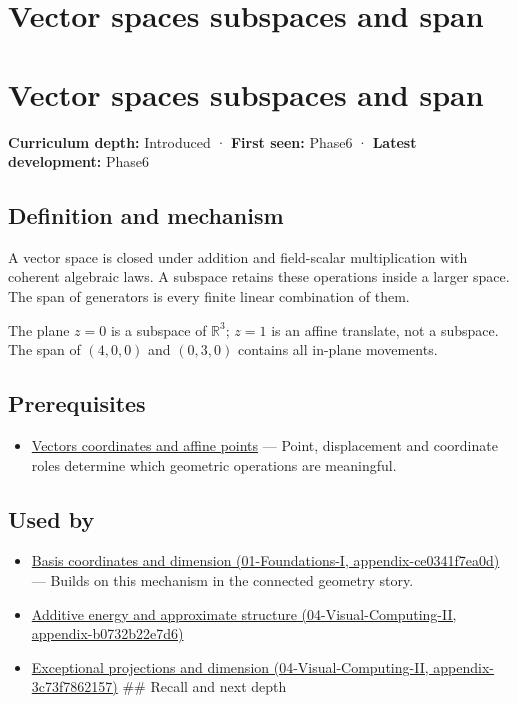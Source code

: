 \hypertarget{appendix-173b52c063ae}{}
\section*{Vector spaces subspaces and span}
\section{Vector spaces subspaces and span}\label{vector-spaces-subspaces-and-span}

\textbf{Curriculum depth:} Introduced · \textbf{First seen:} Phase6 · \textbf{Latest development:} Phase6

\subsection{Definition and mechanism}\label{definition-and-mechanism}

A vector space is closed under addition and field-scalar multiplication with coherent algebraic laws. A subspace retains these operations inside a larger space. The span of generators is every finite linear combination of them.

The plane \(z=0\) is a subspace of \(\mathbb R^3\); \(z=1\) is an affine translate, not a subspace. The span of \((4,0,0)\) and \((0,3,0)\) contains all in-plane movements.

\subsection{Prerequisites}\label{prerequisites}

\begin{itemize}
\tightlist
\item
  \hyperref[appendix-0659864c0aa3]{Vectors coordinates and affine points} --- Point, displacement and coordinate roles determine which geometric operations are meaningful.
\end{itemize}

\subsection{Used by}\label{used-by}

\begin{itemize}
\item
  \href{}{Basis coordinates and dimension (01-Foundations-I, appendix-ce0341f7ea0d)} --- Builds on this mechanism in the connected geometry story.
\item
  \href{}{Additive energy and approximate structure (04-Visual-Computing-II, appendix-b0732b22e7d6)}
\item
  \href{}{Exceptional projections and dimension (04-Visual-Computing-II, appendix-3c73f7862157)} \#\# Recall and next depth
\end{itemize}

